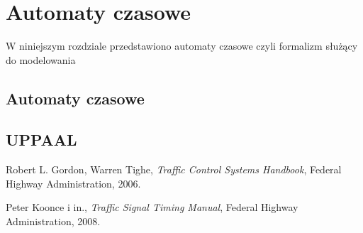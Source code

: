 \documentclass{pracamgr}
\begin{document}
\chapter{Automaty czasowe}
\label{c:ta}

W niniejszym rozdziale przedstawiono automaty czasowe czyli formalizm
służący do modelowania

\section{Automaty czasowe}

\section{UPPAAL}

\begin{thebibliography}{99}

 Robert L. Gordon, Warren Tighe,
\textit{Traffic Control Systems Handbook}, Federal Highway
Administration, 2006.

 Peter Koonce i in., \textit{Traffic Signal
  Timing Manual}, Federal Highway Administration, 2008.

\end{thebibliography}
\end{document}
